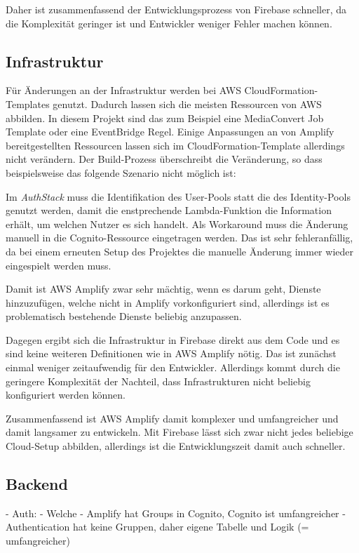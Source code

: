 Daher ist zusammenfassend der Entwicklungsprozess von Firebase schneller, da die Komplexität geringer ist und Entwickler weniger Fehler machen können.

\subsection{Infrastruktur}

Für Änderungen an der Infrastruktur werden bei \ac{AWS} CloudFormation-Templates genutzt. Dadurch lassen sich die meisten Ressourcen von \ac{AWS} abbilden. In diesem Projekt sind das zum Beispiel eine MediaConvert Job Template oder eine EventBridge Regel. Einige Anpassungen an von Amplify bereitgestellten Ressourcen lassen sich im CloudFormation-Template allerdings nicht verändern. Der Build-Prozess überschreibt die Veränderung, so dass beispielsweise das folgende Szenario nicht möglich ist:

Im \textit{AuthStack} muss die Identifikation des User-Pools statt die des Identity-Pools genutzt werden, damit die enstprechende Lambda-Funktion die Information erhält, um welchen Nutzer es sich handelt. Als Workaround muss die Änderung manuell in die Cognito-Ressource eingetragen werden. Das ist sehr fehleranfällig, da bei einem erneuten Setup des Projektes die manuelle Änderung immer wieder eingespielt werden muss.

Damit ist \ac{AWS} Amplify zwar sehr mächtig, wenn es darum geht, Dienste hinzuzufügen, welche nicht in Amplify vorkonfiguriert sind, allerdings ist es problematisch bestehende Dienste beliebig anzupassen.

Dagegen ergibt sich die Infrastruktur in Firebase direkt aus dem Code und es sind keine weiteren Definitionen wie in \ac{AWS} Amplify nötig. Das ist zunächst einmal weniger zeitaufwendig für den Entwickler. Allerdings kommt durch die geringere  Komplexität der Nachteil, dass Infrastrukturen nicht beliebig konfiguriert werden können.

Zusammenfassend ist \ac{AWS} Amplify damit komplexer und umfangreicher und damit langsamer zu entwickeln. Mit Firebase lässt sich zwar nicht jedes beliebige Cloud-Setup abbilden, allerdings ist die Entwicklungszeit damit auch schneller.

\subsection{Backend}

- Auth:
  - Welche
  - Amplify hat Groups in Cognito, Cognito ist umfangreicher
  - Authentication hat keine Gruppen, daher eigene Tabelle und Logik (= umfangreicher)

